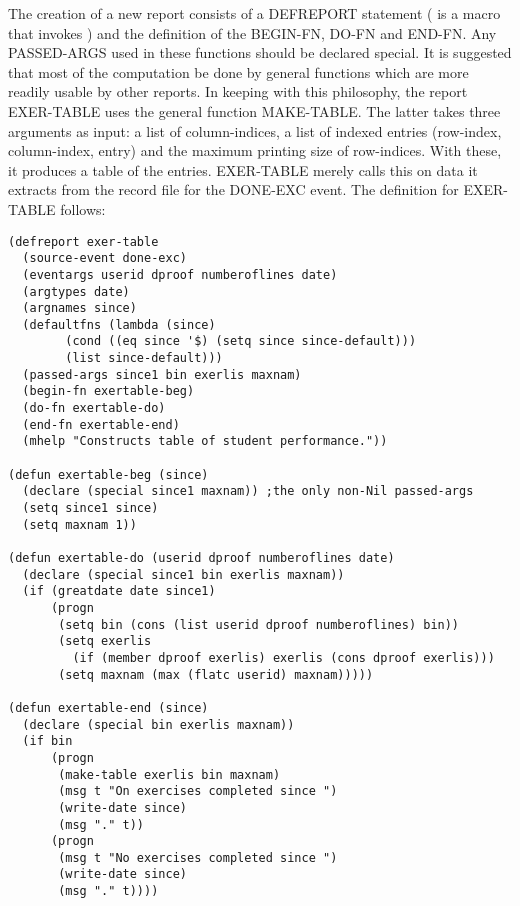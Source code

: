 	The creation of a new report consists of a DEFREPORT statement
( is a macro that invokes )
and the definition of the BEGIN-FN, DO-FN and END-FN. Any PASSED-ARGS
used in these functions should be declared special. It is suggested
that most of the computation be done by general functions which are more
readily usable by other reports. In keeping with this philosophy,
the report EXER-TABLE uses the general function MAKE-TABLE. The latter
takes three arguments as input:  a list of column-indices, a list of
indexed entries (row-index, column-index, entry) and the maximum printing size
of row-indices. With these, it produces a table of the entries.
EXER-TABLE merely calls this on data it extracts from the record file
for the DONE-EXC event. The definition for EXER-TABLE follows:

\begin{verbatim}
(defreport exer-table
  (source-event done-exc)
  (eventargs userid dproof numberoflines date)
  (argtypes date)
  (argnames since)
  (defaultfns (lambda (since)
		(cond ((eq since '$) (setq since since-default)))
		(list since-default)))
  (passed-args since1 bin exerlis maxnam)
  (begin-fn exertable-beg)
  (do-fn exertable-do)
  (end-fn exertable-end)
  (mhelp "Constructs table of student performance."))

(defun exertable-beg (since)
  (declare (special since1 maxnam))	;the only non-Nil passed-args
  (setq since1 since)
  (setq maxnam 1))

(defun exertable-do (userid dproof numberoflines date)
  (declare (special since1 bin exerlis maxnam))
  (if (greatdate date since1)
      (progn
       (setq bin (cons (list userid dproof numberoflines) bin))
       (setq exerlis 
	     (if (member dproof exerlis) exerlis (cons dproof exerlis)))    
       (setq maxnam (max (flatc userid) maxnam)))))

(defun exertable-end (since)
  (declare (special bin exerlis maxnam))
  (if bin 
      (progn
       (make-table exerlis bin maxnam)
       (msg t "On exercises completed since ")
       (write-date since)
       (msg "." t))
      (progn
       (msg t "No exercises completed since ")
       (write-date since)
       (msg "." t))))

\end{verbatim}

